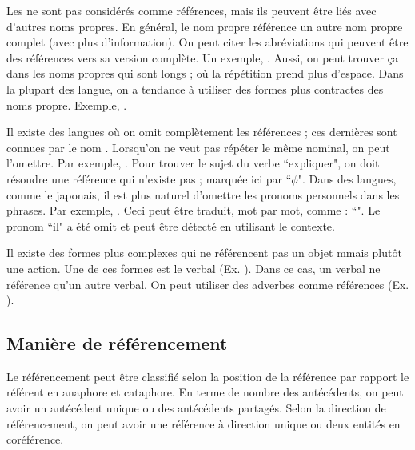\documentclass{KodeBook}
\begin{document}
Les  ne sont pas considérés comme références, mais ils peuvent être liés avec d'autres noms propres. 
En général, le nom propre référence un autre nom propre complet (avec plus d'information). 
On peut citer les abréviations qui peuvent être des références vers sa version complète.
Un exemple, .
Aussi, on peut trouver ça dans les noms propres qui sont longs ; où la répétition prend plus d'espace. 
Dans la plupart des langue, on a tendance à utiliser des formes plus contractes des noms propre. 
Exemple, .

Il existe des langues où on omit complètement les références ; ces dernières sont connues par le nom . 
Lorsqu'on ne veut pas répéter le même  nominal, on peut l'omettre. 
Par exemple, .
Pour trouver le sujet du verbe ``expliquer", on doit résoudre une référence qui n'existe pas ; marquée ici par ``$ \phi $".
Dans des langues, comme le japonais, il est plus naturel d'omettre les pronoms personnels dans les phrases. 
Par exemple, . 
Ceci peut être traduit, mot par mot, comme : ``".
Le pronom ``il" a été omit et peut être détecté en utilisant le contexte.

Il existe des formes plus complexes qui ne référencent pas un objet mmais plutôt une action.
Une de ces formes est le  verbal (Ex. ).
Dans ce cas, un  verbal ne référence qu'un autre  verbal. 
On peut utiliser des adverbes comme références (Ex. ).


\subsection{Manière de référencement}

Le référencement peut être classifié selon la position de la référence par rapport le référent en anaphore et cataphore. 
En terme de nombre des antécédents, on peut avoir un antécédent unique ou des antécédents partagés. 
Selon la direction de référencement, on peut avoir une référence à direction unique ou deux entités en coréférence.
\end{document}

